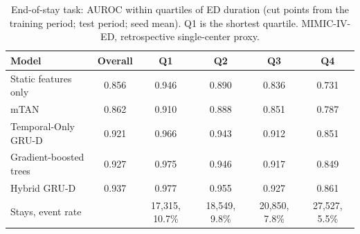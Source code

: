 \begin{table}[t]
\centering
\caption{End-of-stay task: AUROC within quartiles of ED duration (cut points from the training period; test period; seed mean). Q1 is the shortest quartile. MIMIC-IV-ED, retrospective single-center proxy.}
\label{tab:duration}
\begin{tabular}{lccccc}
\toprule
Model & Overall & Q1 & Q2 & Q3 & Q4 \\
\midrule
Static features only & 0.856 & 0.946 & 0.890 & 0.836 & 0.731 \\
mTAN & 0.862 & 0.910 & 0.888 & 0.851 & 0.787 \\
Temporal-Only GRU-D & 0.921 & 0.966 & 0.943 & 0.912 & 0.851 \\
Gradient-boosted trees & 0.927 & 0.975 & 0.946 & 0.917 & 0.849 \\
Hybrid GRU-D & 0.937 & 0.977 & 0.955 & 0.927 & 0.861 \\
\midrule
Stays, event rate &  & 17,315, 10.7\% & 18,549, 9.8\% & 20,850, 7.8\% & 27,527, 5.5\% \\
\bottomrule
\end{tabular}
\end{table}
